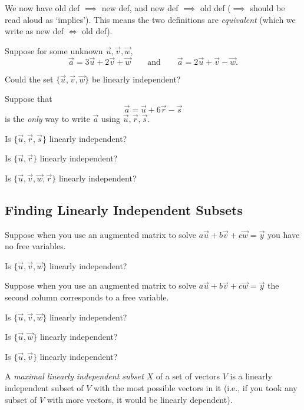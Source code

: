 \documentclass{article}
\begin{document}
	We now have old def $\implies$ new def, and new def $\implies$ old def ($\implies$
	should be read aloud as `implies').  This means the two definitions
	are \emph{equivalent} (which we write as new def $\iff$ old def).


	Suppose for some unknown $\vec u,\vec v,\vec w$,
	\[
		\vec a = 3\vec u+2\vec v +\vec w\qquad \text{and}\qquad 
		\vec a = 2\vec u+\vec v -\vec w.
	\]
	\begin{Enum}
		\item Could the set $\{\vec u,\vec v,\vec w\}$ be linearly
		independent?
	\end{Enum}
	Suppose that
	\[
		\vec a = \vec u+6\vec r-\vec s
	\]
	is the \emph{only} way to write $\vec a$ using $\vec u,\vec r,\vec s$.
	\begin{Enum}[resume]
		\item Is $\{\vec u,\vec r,\vec s\}$ linearly independent?
		\item Is $\{\vec u,\vec r\}$ linearly independent?
		\item Is $\{\vec u,\vec v,\vec w,\vec r\}$ linearly independent?
	\end{Enum}

\subsection*{Finding Linearly Independent Subsets}
	Suppose when you use an augmented matrix to solve
	$a\vec u+b\vec v+c\vec w=\vec y$ you have no free variables.
	
	\begin{Enum}
		\item Is $\{\vec u,\vec v,\vec w\}$ linearly independent?
	\end{Enum}
	
	Suppose when you use an augmented matrix to solve
	$a\vec u+b\vec v+c\vec w=\vec y$ the second column corresponds to a 
	free variable.
	
	\begin{Enum}[resume]
		\item Is $\{\vec u,\vec v,\vec w\}$ linearly independent?
		\item Is $\{\vec u,\vec w\}$ linearly independent?
		\item Is $\{\vec u,\vec v\}$ linearly independent?
	\end{Enum}

	A \emph{maximal linearly independent subset} $X$ of a set of vectors $V$
	is a linearly independent subset of $V$ with the most possible vectors in it 
	(i.e., if you took any subset of $V$ with more vectors, it would be linearly
	dependent).
\end{document}
